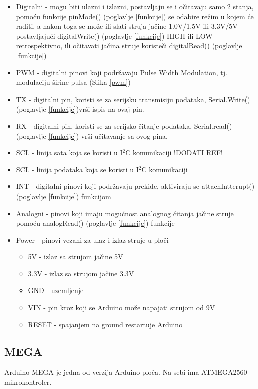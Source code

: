\documentclass[../Document.tex]{subfiles}
\begin{document}
\begin{itemize}
  \item Digitalni - mogu biti ulazni i izlazni, postavljaju se i očitavaju samo 2 stanja, pomoću funkcije pinMode() (poglavlje \ref{funkcije}) se odabire režim u kojem će raditi, a nakon toga se može ili slati struja jačine 1.0V/1.5V ili 3.3V/5V postavljajući digitalWrite() (poglavlje \ref{funkcije}) HIGH ili LOW retrospektivno, ili očitavati jačina struje koristeči digitalRead() (poglavlje \ref{funkcije})
  \item PWM - digitalni pinovi koji podržavaju Pulse Width Modulation, tj. modulaciju širine pulsa (Slika \ref{pwm})
  \item TX - digitalni pin, koristi se za serijsku transmisiju podataka, Serial.Write()  (poglavlje \ref{funkcije})vrši ispis na ovaj pin.
  \item RX - digitalni pin, koristi se za serijsko čitanje podataka, Serial.read() (poglavlje \ref{funkcije}) vrši učitavanje sa ovog pina.
  \item SCL - linija sata koja se koristi u I$^2$C komunikaciji !DODATI REF!
  \item SCL - linija podataka koja se koristi u I$^2$C komunikaciji
  \item INT - digitalni pinovi koji podržavaju prekide, aktiviraju se attachIntterupt() (poglavlje \ref{funkcije}) funkcijom
  \item Analogni - pinovi koji imaju mogućnost analognog čitanja jačine struje pomoću analogRead() (poglavlje \ref{funkcije}) funkcije
  \item Power - pinovi vezani za ulaz i izlaz struje u ploči
        \begin{itemize}
          \item 5V - izlaz sa strujom jačine 5V
          \item 3.3V - izlaz sa strujom jačine 3.3V
          \item GND - uzemljenje
          \item VIN - pin kroz koji se Arduino može napajati strujom od 9V
          \item RESET - spajanjem na ground restartuje Arduino
        \end{itemize}
\end{itemize}

\subsection{MEGA}

Arduino MEGA je jedna od verzija Arduino ploča. Na sebi ima ATMEGA2560 mikrokontroler.\\
\end{document}
